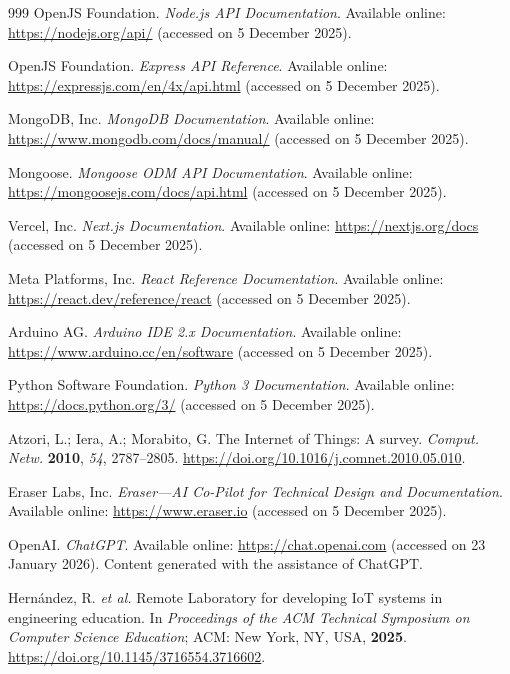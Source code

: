 \documentclass[sensors,article,submit,pdftex]{Definitions/mdpi}
\begin{document}
\begin{thebibliography}{999}
OpenJS Foundation.
\textit{Node.js API Documentation}.
Available online: \url{https://nodejs.org/api/} (accessed on 5 December 2025).

OpenJS Foundation.
\textit{Express API Reference}.
Available online: \url{https://expressjs.com/en/4x/api.html} (accessed on 5 December 2025).

MongoDB, Inc.
\textit{MongoDB Documentation}.
Available online: \url{https://www.mongodb.com/docs/manual/} (accessed on 5 December 2025).

Mongoose.
\textit{Mongoose ODM API Documentation}.
Available online: \url{https://mongoosejs.com/docs/api.html} (accessed on 5 December 2025).

Vercel, Inc.
\textit{Next.js Documentation}.
Available online: \url{https://nextjs.org/docs} (accessed on 5 December 2025).

Meta Platforms, Inc.
\textit{React Reference Documentation}.
Available online: \url{https://react.dev/reference/react} (accessed on 5 December 2025).

Arduino AG.
\textit{Arduino IDE 2.x Documentation}.
Available online: \url{https://www.arduino.cc/en/software} (accessed on 5 December 2025).

Python Software Foundation.
\textit{Python 3 Documentation}.
Available online: \url{https://docs.python.org/3/} (accessed on 5 December 2025).

Atzori, L.; Iera, A.; Morabito, G.
The Internet of Things: A survey.
\textit{Comput. Netw.} \textbf{2010}, \textit{54}, 2787--2805.
\href{https://doi.org/10.1016/j.comnet.2010.05.010}{https://doi.org/10.1016/j.comnet.2010.05.010}.

Eraser Labs, Inc.
\textit{Eraser---AI Co-Pilot for Technical Design and Documentation}.
Available online: \url{https://www.eraser.io} (accessed on 5 December 2025).

OpenAI. \textit{ChatGPT}.
Available online: \url{https://chat.openai.com} (accessed on 23 January 2026). Content generated with the assistance of ChatGPT.

Hern\'andez, R. \textit{et al.}
Remote Laboratory for developing IoT systems in engineering education.
In \textit{Proceedings of the ACM Technical Symposium on Computer Science Education}; ACM: New York, NY, USA, \textbf{2025}.
\href{https://doi.org/10.1145/3716554.3716602}{https://doi.org/10.1145/3716554.3716602}.


\end{thebibliography}
\end{document}

